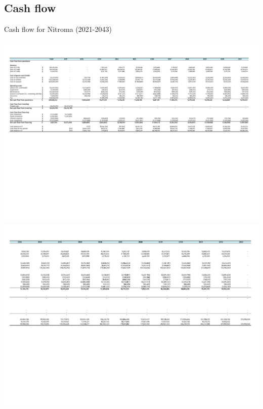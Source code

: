  \begin{landscape}
 

\subsection{Cash flow}
\begin{table}
\label{tab:CashFlow}
  \caption{Cash flow for Nitroma (2021-2043)}
\includegraphics[clip, trim=0cm 8cm 0cm 1cm, width=\linewidth]{chapters/Z-support/attachments/Cash1.pdf} \\

\includegraphics[clip, trim=0cm 8cm 0cm 1cm, width=\linewidth]{chapters/Z-support/attachments/Cash2.pdf}
\end{table}

 \end{landscape}
 
